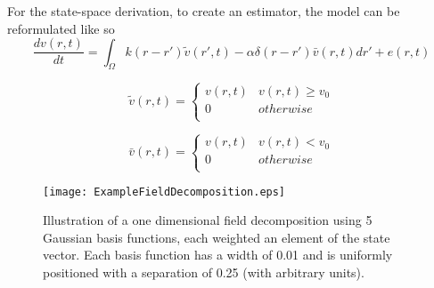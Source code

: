\documentclass[onecolumn,draftcls]{IEEEtran}
\begin{document}
For the state-space derivation, to create an estimator, the model can be reformulated like so
\begin{equation}\label{new_spatiotemporal_kernels}
\frac{{dv\left( {r,t} \right)}}{{dt}} = \int_\Omega  {k\left( {r - r'} \right)\tilde v\left( {r',t} \right) - \alpha \delta \left( {r - r'} \right)\bar v\left( {r,t} \right)dr'}  + e\left( {r,t} \right)
\end{equation}

\begin{equation}\label{define_v_tilde}
\tilde v\left( {r,t} \right) = \left\{ {\begin{array}{*{20}{c}}
   {v\left( {r,t} \right)} & {v\left( {r,t} \right) \ge {v_0}}  \\
   0 & {otherwise}  \\
\end{array}} \right.
\end{equation}

\begin{equation}\label{define_v_bar}
\bar v\left( {r,t} \right) = \left\{ {\begin{array}{*{20}{c}}
   {v\left( {r,t} \right)} & {v\left( {r,t} \right) < {v_0}}  \\
   0 & {otherwise}  \\
\end{array}} \right.
\end{equation}

\begin{figure*}
\centering
\texttt{[image: ExampleFieldDecomposition.eps]}
\caption[ExampleFieldDecomposition]{Illustration of a one dimensional field decomposition using 5 Gaussian basis functions, each weighted an element of the state vector. Each basis function has a width of 0.01 and is uniformly positioned with a separation of 0.25 (with arbitrary units).}
\label{ExampleFieldDecomposition}
\end{figure*}
\end{document}
